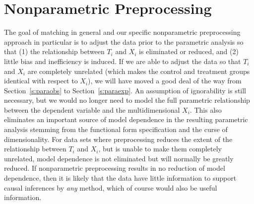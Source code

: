 \documentclass[11pt,titlepage]{article}
\begin{document}
\section{Nonparametric Preprocessing} \label{s:nonparpreproc}

The goal of matching in general and our specific nonparametric
preprocessing approach in particular is to adjust the data prior to
the parametric analysis so that (1) the relationship between $T_i$ and
$X_i$ is eliminated or reduced, and (2) little bias and inefficiency
is induced.  If we are able to adjust the data so that $T_i$ and $X_i$
are completely unrelated (which makes the control and treatment groups
identical with respect to $X_i$), we will have moved a good deal of
the way from Section~\ref{s:paraobs} to Section~\ref{s:paraexp}.  An
assumption of ignorability is still necessary, but we would no longer
need to model the full parametric relationship between the dependent
variable and the multidimensional $X_i$.  This also eliminates an
important source of model dependence in the resulting parametric
analysis stemming from the functional form specification and the curse
of dimensionality.  For data sets where preprocessing reduces the
extent of the relationship between $T_i$ and $X_i$, but is unable to
make them completely unrelated, model dependence is not eliminated but
will normally be greatly reduced.  If nonparametric preprocessing
results in no reduction of model dependence, then it is likely that
the data have little information to support causal inferences by
\emph{any} method, which of course would also be useful information.
\end{document}
